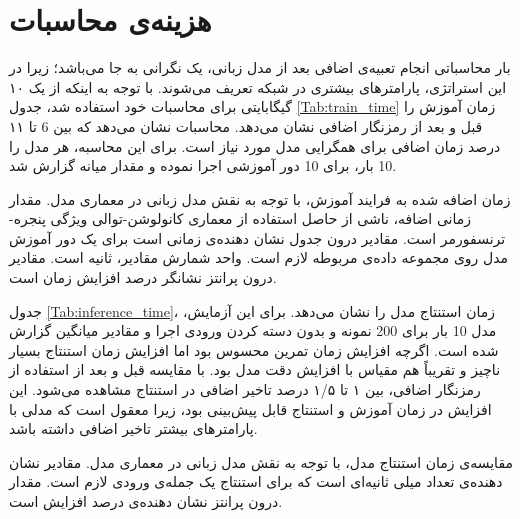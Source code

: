 \section{هزینه‌ی محاسبات}
بار محاسباتی انجام تعبیه‌ی اضافی بعد از مدل زبانی، یک نگرانی به جا می‌باشد؛ زیرا در این استراتژی، پارامترهای بیشتری در شبکه تعریف می‌شوند. با توجه به اینکه از یک  ۱۰ گیگابایتی برای محاسبات خود استفاده شد، جدول \ref{Tab:train_time} زمان آموزش را قبل و بعد از رمزنگار اضافی نشان می‌دهد. محاسبات نشان می‌دهد که بین 6 تا ۱۱ درصد زمان اضافی برای همگرایی مدل مورد نیاز است. برای این محاسبه، هر مدل را 10 بار، برای 10 دور آموزشی اجرا نموده و مقدار میانه گزارش شد.
\begin{table}[ht]
		
	\caption[زمان اضافه شده به فرایند آموزش، با توجه به نقش مدل زبانی در معماری مدل]{
		زمان اضافه شده به فرایند آموزش، با توجه به نقش مدل زبانی در معماری مدل. مقدار زمانی اضافه، ناشی از حاصل استفاده از معماری کانولوشن-توالی ویژگی پنجره-ترنسفورمر است. مقادیر درون جدول نشان دهنده‌ی زمانی است برای یک دور آموزش مدل روی مجموعه داده‌ی مربوطه لازم است. واحد شمارش مقادیر، ثانیه است. مقادیر درون پرانتز نشانگر درصد افزایش زمان است.
	}
	\label{Tab:train_time}
\end{table}
جدول \ref{Tab:inference_time}، زمان استنتاج مدل را نشان می‌دهد. برای این آزمایش، مدل 10 بار برای 200 نمونه و بدون دسته کردن ورودی اجرا و مقادیر میانگین گزارش شده است. اگرچه افزایش زمان تمرین محسوس بود اما افزایش زمان استنتاج بسیار ناچیز و تقریباً هم مقیاس با افزایش دقت مدل بود. با مقایسه قبل و بعد از استفاده از رمزنگار اضافی، بین ۱ تا ۱/‍‍۵ درصد تاخیر اضافی در استنتاج مشاهده می‌شود. این  افزایش در زمان آموزش و استنتاج قابل پیش‌بینی بود، زیرا معقول است که مدلی با پارامترهای بیشتر تاخیر اضافی داشته باشد.
\begin{table}[ht]
			
	\caption[مقایسه‌ی زمان استنتاج مدل، با توجه به نقش مدل زبانی در معماری مدل]{
		مقایسه‌ی زمان استنتاج مدل، با توجه به نقش مدل زبانی در معماری مدل. مقادیر نشان دهنده‌ی تعداد میلی ثانیه‌ای است که برای استنتاج یک جمله‌ی ورودی لازم است. مقدار درون پرانتز نشان دهنده‌ی درصد افزایش است.
	}
\label{Tab:inference_time}
\end{table}

